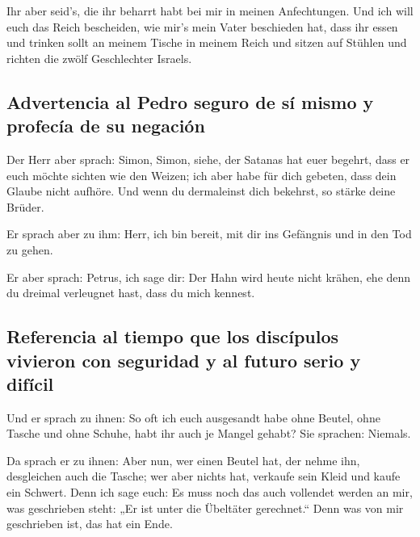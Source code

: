  Ihr aber seid's, die ihr beharrt habt bei mir in meinen
Anfechtungen.  Und ich will euch das Reich bescheiden,
wie mir's mein Vater beschieden hat,  dass ihr essen und
trinken sollt an meinem Tische in meinem Reich und sitzen auf Stühlen
und richten die zwölf Geschlechter Israels.

\hypertarget{advertencia-al-pedro-seguro-de-suxed-mismo-y-profecuxeda-de-su-negaciuxf3n}{%
\subsection{Advertencia al Pedro seguro de sí mismo y profecía de su
negación}\label{advertencia-al-pedro-seguro-de-suxed-mismo-y-profecuxeda-de-su-negaciuxf3n}}

 Der Herr aber sprach: Simon, Simon, siehe, der Satanas
hat euer begehrt, dass er euch möchte sichten wie den Weizen;
 ich aber habe für dich gebeten, dass dein Glaube nicht
aufhöre. Und wenn du dermaleinst dich bekehrst, so stärke deine Brüder.

 Er sprach aber zu ihm: Herr, ich bin bereit, mit dir ins
Gefängnis und in den Tod zu gehen.

 Er aber sprach: Petrus, ich sage dir: Der Hahn wird
heute nicht krähen, ehe denn du dreimal verleugnet hast, dass du mich
kennest.

\hypertarget{referencia-al-tiempo-que-los-discuxedpulos-vivieron-con-seguridad-y-al-futuro-serio-y-difuxedcil}{%
\subsection{Referencia al tiempo que los discípulos vivieron con
seguridad y al futuro serio y
difícil}\label{referencia-al-tiempo-que-los-discuxedpulos-vivieron-con-seguridad-y-al-futuro-serio-y-difuxedcil}}

 Und er sprach zu ihnen: So oft ich euch ausgesandt habe
ohne Beutel, ohne Tasche und ohne Schuhe, habt ihr auch je Mangel
gehabt? Sie sprachen: Niemals.

 Da sprach er zu ihnen: Aber nun, wer einen Beutel hat,
der nehme ihn, desgleichen auch die Tasche; wer aber nichts hat,
verkaufe sein Kleid und kaufe ein Schwert.  Denn ich sage
euch: Es muss noch das auch vollendet werden an mir, was geschrieben
steht: „Er ist unter die Übeltäter gerechnet.`` Denn was von mir
geschrieben ist, das hat ein Ende.

